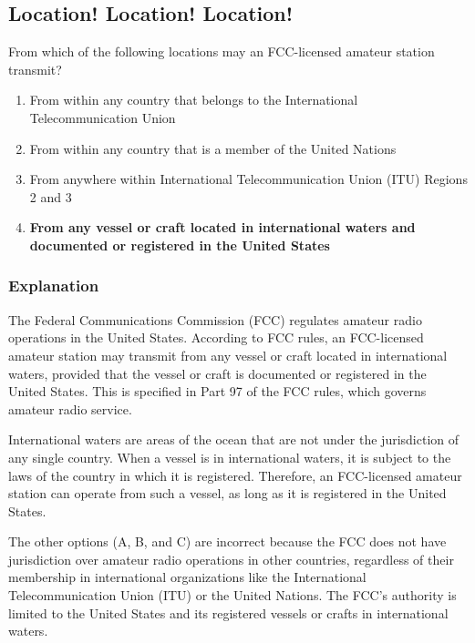 \subsection{Location! Location! Location!}
\label{T1C06}

\begin{tcolorbox}[colback=gray!10!white,colframe=black!75!black,title=T1C06]
From which of the following locations may an FCC-licensed amateur station transmit?
\begin{enumerate}[label=\Alph*)]
    \item From within any country that belongs to the International Telecommunication Union
    \item From within any country that is a member of the United Nations
    \item From anywhere within International Telecommunication Union (ITU) Regions 2 and 3
    \item \textbf{From any vessel or craft located in international waters and documented or registered in the United States}
\end{enumerate}
\end{tcolorbox}

\subsubsection{Explanation}
The Federal Communications Commission (FCC) regulates amateur radio operations in the United States. According to FCC rules, an FCC-licensed amateur station may transmit from any vessel or craft located in international waters, provided that the vessel or craft is documented or registered in the United States. This is specified in Part 97 of the FCC rules, which governs amateur radio service.

International waters are areas of the ocean that are not under the jurisdiction of any single country. When a vessel is in international waters, it is subject to the laws of the country in which it is registered. Therefore, an FCC-licensed amateur station can operate from such a vessel, as long as it is registered in the United States.

The other options (A, B, and C) are incorrect because the FCC does not have jurisdiction over amateur radio operations in other countries, regardless of their membership in international organizations like the International Telecommunication Union (ITU) or the United Nations. The FCC's authority is limited to the United States and its registered vessels or crafts in international waters.


